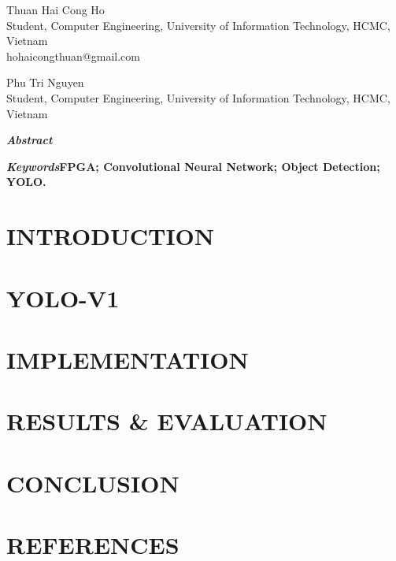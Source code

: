 \documentclass[a4paper, 10pt]{paper}
\begin{document}
    \title{}
    \author{}
    \maketitle %

    \begin{multicols}{2}
        \begin{center}
            Thuan Hai Cong Ho\\
            Student, Computer Engineering, University of Information Technology, HCMC, Vietnam\\
            hohaicongthuan@gmail.com
        \end{center}
        \begin{center}
            Phu Tri Nguyen\\
            Student, Computer Engineering, University of Information Technology, HCMC, Vietnam
        \end{center}
    \end{multicols}

    \begin{multicols}{2}
        
        \textbf{\textit{Abstract\textemdash}}

        \textbf{}
        
        \bigskip

        \textbf{\textit{Keywords\textemdash}FPGA; Convolutional Neural Network; Object Detection; YOLO.}

        \section{INTRODUCTION}

        \section{YOLO-V1}

        \section{IMPLEMENTATION}

        \section{RESULTS \& EVALUATION}

        \section{CONCLUSION}

        \section*{REFERENCES}

    \end{multicols}
\end{document}
